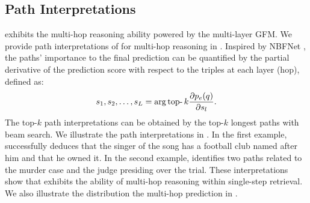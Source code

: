 \subsection{Path Interpretations}\label{sec:interpretation}
\ourmethod exhibits the multi-hop reasoning ability powered by the multi-layer GFM. We provide path interpretations of \ourmethod for multi-hop reasoning in . Inspired by NBFNet \citep{zhu2021neural}, the paths' importance to the final prediction can be quantified by the partial derivative of the prediction score with respect to the triples at each layer (hop), defined as:
\begin{equation}
    \setlength\abovedisplayskip{0pt}%
    \setlength\belowdisplayskip{0pt}
    s_1,s_2,\ldots,s_L=\arg\mathop{\text{top-}}k\frac{\partial p_e(q)}{\partial s_l}.
\end{equation}
The top-$k$ path interpretations can be obtained by the top-$k$ longest paths with beam search. We illustrate the path interpretations in . In the first example, \ourmethod successfully deduces that the singer of the song has a football club named after him and that he owned it. In the second example, \ourmethod identifies two paths related to the murder case and the judge presiding over the trial. These interpretations show that \ourmethod exhibits the ability of multi-hop reasoning within single-step retrieval. We also illustrate the distribution the multi-hop prediction in .